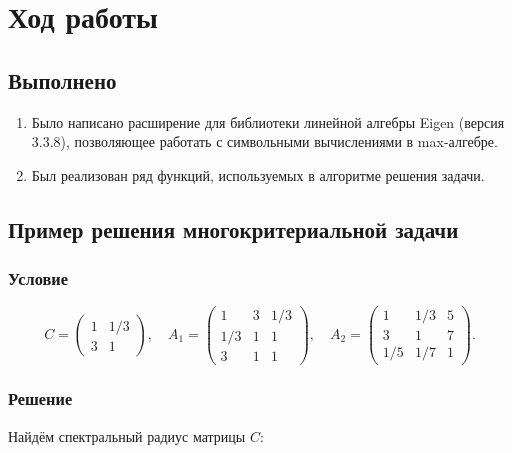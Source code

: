 \documentclass[specialist,
  substylefile = spbu.rtx,
  href,
  colorlinks=true,
  12pt]{disser}
\begin{document}
\chapter{Ход работы}
\section{Выполнено}
  \begin{enumerate}
    \item Было написано расширение для библиотеки линейной алгебры Eigen \cite{eigenweb} (версия 3.3.8), позволяющее работать с символьными вычислениями в max-алгебре.
    \item Был реализован ряд функций, используемых в алгоритме решения задачи.
  \end{enumerate}

\section{Пример решения многокритериальной задачи}
	\subsection{Условие}

     \[
		C = \begin{pmatrix}
			1 & 1/3 \\
			3 & 1
		\end{pmatrix}, \quad
		A_1 = \begin{pmatrix}
			1   & 3 & 1/3 \\
			1/3 & 1 & 1   \\
			3   & 1 & 1
		\end{pmatrix}, \quad
		A_2 =  \begin{pmatrix}
			1   & 1/3 & 5 \\
			3 & 1 & 7   \\
			1/5   & 1/7 & 1
		\end{pmatrix}.
	\]
	\subsection{Решение}
	Найдём спектральный радиус матрицы \(C\):
	
\end{document}
